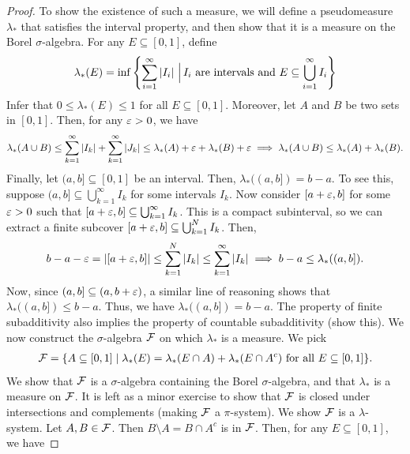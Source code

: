 \begin{proof}
    To show the existence of such a measure, we will define a pseudomeasure $\lambda_{\ast}$ that satisfies the interval property, and then show that it is a measure on the Borel $\sigma$-algebra. For any $E \subseteq [0,1]$, define
    \begin{align}
        \lambda_{\ast}(E) = \inf\left\{ \sum_{i=1}^{\infty} \left| I_{i} \right| \, \Big| \, I_{i} \text{ are intervals and } E \subseteq \bigcup_{i=1}^{\infty} I_{i} \right\}
    \end{align}
    Infer that $0 \leq \lambda_{\ast}(E) \leq 1$ for all $E \subseteq [0,1]$. Moreover, let $A$ and $B$ be two sets in $[0,1]$. Then, for any $\varepsilon > 0$, we have
    \begin{align}
        \lambda_{\ast}(A \cup B) \leq \sum_{k=1}^{\infty} \left| I_{k} \right| + \sum_{k=1}^{\infty} \left| J_{k} \right| \leq \lambda_{\ast}(A) + \varepsilon + \lambda_{\ast}(B) + \varepsilon \implies \lambda_{\ast}(A \cup B) \leq \lambda_{\ast}(A) + \lambda_{\ast}(B).
    \end{align}
    Finally, let $(a,b] \subseteq [0,1]$ be an interval. Then, $\lambda_{\ast}((a,b]) = b-a$. To see this, suppose $(a,b] \subseteq \bigcup_{k=1}^{\infty} I_{k}$ for some intervals $I_{k}$. Now consider $[a+\varepsilon,b]$ for some $\varepsilon > 0$ such that $[a+\varepsilon,b] \subseteq \bigcup_{k=1}^{\infty} I_{k}$. This is a compact subinterval, so we can extract a finite subcover $[a+\varepsilon,b] \subseteq \bigcup_{k=1}^{N} I_{k}$. Then,
    \begin{align}
        b-a-\varepsilon = \left| [a+\varepsilon,b] \right| \leq \sum_{k=1}^{N} \left| I_{k} \right| \leq \sum_{k=1}^{\infty} \left| I_{k} \right| \implies b-a \leq \lambda_{\ast}((a,b]).
    \end{align}
    Now, since $(a,b] \subseteq (a,b+\varepsilon)$, a similar line of reasoning shows that $\lambda_{\ast}((a,b]) \leq b-a$. Thus, we have $\lambda_{\ast}((a,b]) = b-a$. The property of finite subadditivity also implies the property of countable subadditivity (show this). We now construct the $\sigma$-algebra $\mathcal{F}$ on which $\lambda_{\ast}$ is a measure. We pick
    \begin{align}
        \mathcal{F} = \{A \subseteq [0,1] \mid \lambda_{\ast}(E) = \lambda_{\ast}(E \cap A) + \lambda_{\ast}(E \cap A^{c}) \text{ for all } E \subseteq [0,1]\}.
    \end{align}
    We show that $\mathcal{F}$ is a $\sigma$-algebra containing the Borel $\sigma$-algebra, and that $\lambda_{\ast}$ is a measure on $\mathcal{F}$. It is left as a minor exercise to show that $\mathcal{F}$ is closed under intersections and complements (making $\mathcal{F}$ a $\pi$-system). We show $\mathcal{F}$ is a $\lambda$-system. Let $A,B \in \mathcal{F}$. Then $B \setminus A = B \cap A^{c}$ is in $\mathcal{F}$. Then, for any $E \subseteq [0,1]$, we have

\end{proof}
